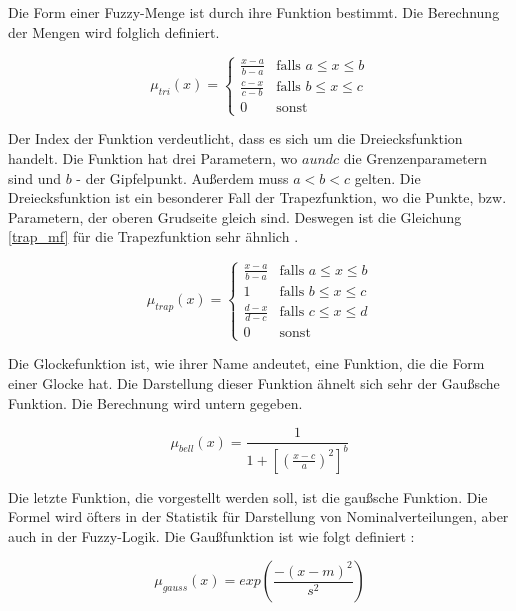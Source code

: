 Die Form einer Fuzzy-Menge ist durch ihre Funktion bestimmt. Die Berechnung der Mengen wird folglich definiert.

\begin{equation}
	\mu_{tri}(x) = \begin{cases}
						\frac{x - a}{b - a} & \text{falls $a \leq x \leq b$}\\
						\frac{c - x}{c - b} & \text{falls $b \leq x \leq c$}\\
						0 & \text{sonst}
					\end{cases}
\end{equation}

Der Index der Funktion verdeutlicht, dass es sich um die Dreiecksfunktion handelt. Die Funktion hat drei Parametern, wo $a und c$ die Grenzenparametern sind und $b$ - der Gipfelpunkt. Außerdem muss $a < b < c$ gelten. Die Dreiecksfunktion ist ein besonderer Fall der Trapezfunktion, wo die Punkte, bzw. Parametern, der oberen Grudseite gleich sind. Deswegen ist die Gleichung \ref{trap_mf} für die Trapezfunktion sehr ähnlich \cite{CIKruse:15}.

\begin{equation}
\mu_{trap}(x) = \begin{cases}
\frac{x - a}{b - a} & \text{falls $a \leq x \leq b$}\\
1 & \text{falls $b \leq x \leq c$}\\
\frac{d - x}{d - c} & \text{falls $c \leq x \leq d$}\\
0 & \text{sonst}

\label{trap_mf}
\end{cases}
\end{equation}

Die Glockefunktion ist, wie ihrer Name andeutet, eine Funktion, die die Form einer Glocke hat. Die Darstellung dieser Funktion ähnelt sich sehr der Gaußsche Funktion. Die Berechnung wird untern gegeben. 

\begin{equation}
\mu_{bell}(x) = \frac{1}{1 + [(\frac{x - c}{a})^2]^b}
\label{bell_mf}
\end{equation}

Die letzte Funktion, die vorgestellt werden soll, ist die gaußsche Funktion. Die Formel wird öfters in der Statistik für Darstellung von Nominalverteilungen, aber auch in der Fuzzy-Logik. Die Gaußfunktion ist wie folgt definiert \cite{CIKruse:15}:

\begin{equation}
	\mu_{gauss}(x) = exp(\frac{-(x - m)^2}{s^2})
	\label{gauss_mf}
\end{equation}

